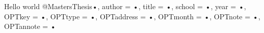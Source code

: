 \documentclass[10pt,a4paper]{article}
\begin{document}
Hello world
@MastersThesis{•,
author = {•},
title = {•},
school = {•},
year = {•},
OPTkey = {•},
OPTtype = {•},
OPTaddress = {•},
OPTmonth = {•},
OPTnote = {•},
OPTannote = {•}
}
\end{document}
